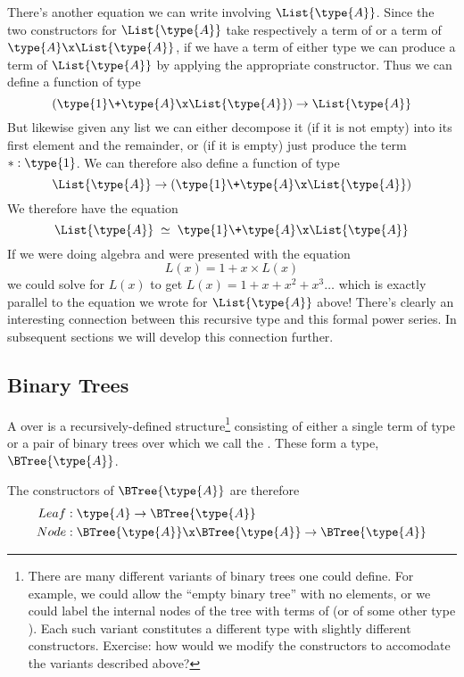 There's another equation we can write involving $\List{\type{A}}$.  Since the two constructors for $\List{\type{A}}$ take respectively a term of  or a term of $\type{A} \x \List{\type{A}}$, if we have a term of either type we can produce a term of $\List{\type{A}}$ by applying the appropriate constructor.  Thus we can define a function of type
\[
(\type{1} \+ \type{A} \x \List{\type{A}}) \to \List{\type{A}}
\]
But likewise given any list we can either decompose it (if it is not empty) into its first element and the remainder, or (if it is empty) just produce the term $\ast:\type{1}$.  We can therefore also define a function of type
\[
\List{\type{A}} \to (\type{1} \+ \type{A} \x \List{\type{A}})
\]
We therefore have the equation 
\[
\List{\type{A}} \;\simeq\; \type{1} \+ \type{A} \x \List{\type{A}}
\]
If we were doing algebra and were presented with the equation
\[
L(x) = 1 + x \times L(x)
\]
we could solve for $L(x)$ to get $L(x) = 1 + x + x^2 + x^3 \ldots$ which is exactly parallel to the equation we wrote for $\List{\type{A}}$ above!  There's clearly an interesting connection between this recursive type and this formal power series.  In subsequent sections we will develop this connection further.


\subsection{Binary Trees}

A  over  is a recursively-defined structure\footnote{
There are many different variants of binary trees one could define.  For example, we could allow the ``empty binary tree'' with no elements, or we could label the internal nodes of the tree with terms of  (or of some other type ).  Each such variant constitutes a different type with slightly different constructors.  
Exercise: how would we modify the constructors to accomodate the variants described above?
} 
consisting of either a single term of type  or a pair of binary trees over  which we call the .  These form a type, $\BTree{\type{A}}$.

The constructors of $\BTree{\type{A}}$ are therefore
\begin{align*}
Leaf&: \type{A} \to \BTree{\type{A}}
\\
Node&: \BTree{\type{A}} \x \BTree{\type{A}} \to \BTree{\type{A}}
\end{align*}

